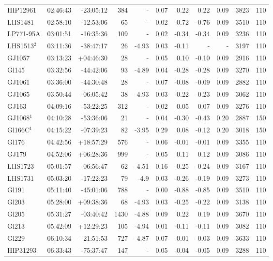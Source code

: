 \documentclass{aa}
\begin{document}
{\begin{longtable}{l r r r r r r r r r r}
HIP12961 & 02:46:43 & -23:05:12 & 384 &    - & 0.07 & 0.22 & 0.22 & 0.09 & 3823 &  110 \\
LHS1481 & 02:58:10 & -12:53:06 & 65 &    - & 0.02 & -0.72 & -0.76 & 0.09 & 3510 &  110 \\
LP771-95A & 03:01:51 & -16:35:36 & 109 &    - & 0.02 & -0.34 & -0.34 & 0.09 & 3236 &  110 \\
LHS1513$^{2}$ & 03:11:36 & -38:47:17 & 26 & -4.93 & 0.03 & -0.11 & - & - &  3197 &  110 \\
GJ1057 & 03:13:23 & +04:46:30 & 28 &    - & 0.05 & 0.10 & -0.10 & 0.09 & 2916 &  110 \\
Gl145 & 03:32:56 & -44:42:06 & 93 & -4.89 & 0.04 & -0.28 & -0.28 & 0.09 & 3270 &  110 \\
GJ1061 & 03:36:00 & -44:30:48 & 28 &    - & 0.07 & -0.08 & -0.09 & 0.09 & 2882 &  110 \\
GJ1065 & 03:50:44 & -06:05:42 & 38 & -4.93 & 0.03 & -0.22 & -0.23 & 0.09 & 3062 &  110 \\
GJ163 & 04:09:16 & -53:22:25 & 312 &    - & 0.02 & 0.05 & 0.07 & 0.09 & 3276 &  110 \\
GJ1068$^1$ & 04:10:28 & -53:36:06 & 21 &    - & 0.04 & -0.30 & -0.43 & 0.20 & 2887 &  150 \\
Gl166C$^1$ & 04:15:22 & -07:39:23 & 82 & -3.95 & 0.29 & 0.08 & -0.12 & 0.20 & 3018 &  150 \\
Gl176 & 04:42:56 & +18:57:29 & 576 &    - & 0.06 & -0.01 & -0.01 & 0.09 & 3355 &  110 \\
GJ179 & 04:52:06 & +06:28:36 & 999 &    - & 0.05 & 0.11 & 0.12 & 0.09 & 3086 &  110 \\
LHS1723 & 05:01:57 & -06:56:47 & 62 & -4.51 & 0.16 & -0.25 & -0.24 & 0.09 & 3167 &  110 \\
LHS1731 & 05:03:20 & -17:22:23 & 79 & -4.9 & 0.03 & -0.26 & -0.19 & 0.09 & 3273 &  110 \\
Gl191 & 05:11:40 & -45:01:06 & 788 &    - & 0.00 & -0.88 & -0.85 & 0.09 & 3510 &  110 \\
Gl203 & 05:28:00 & +09:38:36 & 68 & -4.93 & 0.03 & -0.25 & -0.22 & 0.09 & 3138 &  110 \\
Gl205 & 05:31:27 & -03:40:42 & 1430 & -4.88 & 0.09 & 0.22 & 0.19 & 0.09 & 3670 &  110 \\
Gl213 & 05:42:09 & +12:29:23 & 105 & -4.94 & 0.01 & -0.11 & -0.11 & 0.09 & 3082 &  110 \\
Gl229 & 06:10:34 & -21:51:53 & 727 & -4.87 & 0.07 & -0.01 & -0.03 & 0.09 & 3633 &  110 \\
HIP31293 & 06:33:43 & -75:37:47 & 147 &    - & 0.05 & -0.04 & -0.05 & 0.09 & 3288 &  110 \\

\end{longtable}}
\end{document}
